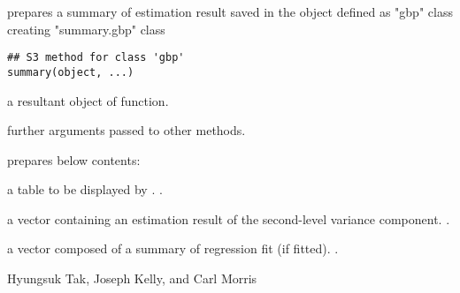 \documentclass[a4paper]{book}
\begin{document}
%
\begin{Description}\relax
{} prepares a summary of estimation result saved in the object defined as "gbp" class creating "summary.gbp" class
\end{Description}
%
\begin{Usage}
\begin{verbatim}
## S3 method for class 'gbp'
summary(object, ...)
\end{verbatim}
\end{Usage}
%
\begin{Arguments}
\begin{ldescription}
\item[\code{object}] 
a resultant object of  function. 

\item[\code{...}] 
further arguments passed to other methods.

\end{ldescription}
\end{Arguments}
%
\begin{Value}
 prepares below contents:
\begin{ldescription}
\item[\code{main}] 
a table to be displayed by . .

\item[\code{sec.var}] 
a vector containing an estimation result of the second-level variance component. .

\item[\code{reg}] 
a vector composed of a summary of regression fit (if fitted). .

\end{ldescription}
\end{Value}
%
\begin{Author}\relax
Hyungsuk Tak, Joseph Kelly, and Carl Morris
\end{Author}
%
\end{document}
